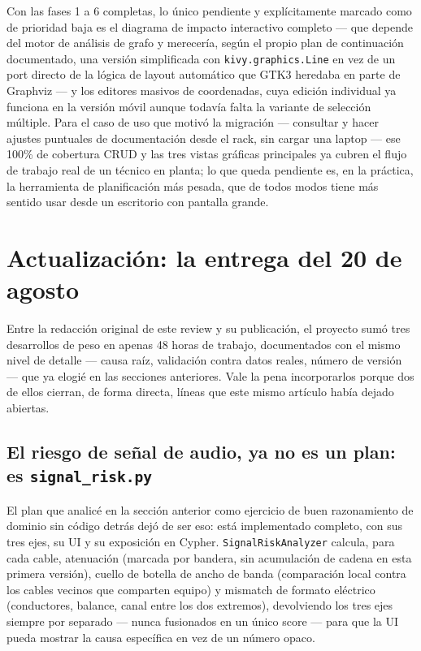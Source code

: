 \documentclass[11pt,twocolumn]{article}
\begin{document}
Con las fases 1 a 6 completas, lo único pendiente y explícitamente marcado como de prioridad baja es el diagrama de impacto interactivo completo --- que depende del motor de análisis de grafo y merecería, según el propio plan de continuación documentado, una versión simplificada con \texttt{kivy.graphics.Line} en vez de un port directo de la lógica de layout automático que GTK3 heredaba en parte de Graphviz --- y los editores masivos de coordenadas, cuya edición individual ya funciona en la versión móvil aunque todavía falta la variante de selección múltiple. Para el caso de uso que motivó la migración --- consultar y hacer ajustes puntuales de documentación desde el rack, sin cargar una laptop --- ese 100\% de cobertura CRUD y las tres vistas gráficas principales ya cubren el flujo de trabajo real de un técnico en planta; lo que queda pendiente es, en la práctica, la herramienta de planificación más pesada, que de todos modos tiene más sentido usar desde un escritorio con pantalla grande.

\section{Actualización: la entrega del 20 de agosto}

Entre la redacción original de este review y su publicación, el proyecto sumó tres desarrollos de peso en apenas 48 horas de trabajo, documentados con el mismo nivel de detalle --- causa raíz, validación contra datos reales, número de versión --- que ya elogié en las secciones anteriores. Vale la pena incorporarlos porque dos de ellos cierran, de forma directa, líneas que este mismo artículo había dejado abiertas.

\subsection{El riesgo de señal de audio, ya no es un plan: es \texttt{signal\_risk.py}}

El plan que analicé en la sección anterior como ejercicio de buen razonamiento de dominio sin código detrás dejó de ser eso: está implementado completo, con sus tres ejes, su UI y su exposición en Cypher. \texttt{SignalRiskAnalyzer} calcula, para cada cable, atenuación (marcada por bandera, sin acumulación de cadena en esta primera versión), cuello de botella de ancho de banda (comparación local contra los cables vecinos que comparten equipo) y mismatch de formato eléctrico (conductores, balance, canal entre los dos extremos), devolviendo los tres ejes siempre por separado --- nunca fusionados en un único score --- para que la UI pueda mostrar la causa específica en vez de un número opaco.
\end{document}
